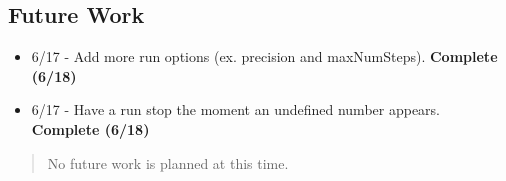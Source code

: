 \subsection*{Future Work}

\begin{itemize}
\item 6/17 - %
Add more run options (ex. precision and maxNumSteps). 
\textbf{Complete (6/18)}

\item 6/17 - %
Have a run stop the moment an undefined number appears. 
\textbf{Complete (6/18)}
\end{itemize}

\begin{quotation}
No future work is planned at this time.
\end{quotation}


%
